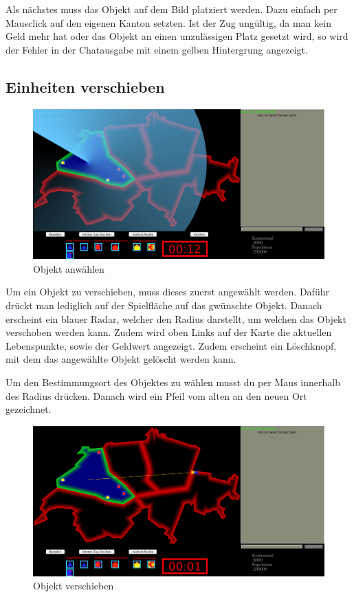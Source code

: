 \documentclass[ngerman, 12pt, pdftex]{scrartcl}[2006/07/30]
\begin{document}
Als nächstes muss das Objekt auf dem Bild platziert werden. Dazu einfach per Mausclick auf den eigenen Kanton setzten. Ist der Zug ungültig, da man kein Geld mehr hat oder das Objekt an einen unzulässigen Platz gesetzt wird, so wird der Fehler in der Chatausgabe mit einem gelben Hintergrung angezeigt.

\newpage

\subsection{Einheiten verschieben}

\begin{figure}[h]
\centering
\includegraphics[scale=0.29]{spiel/Objekt_anwaehlen.png}
\caption{Objekt anw\"{a}hlen}
\end{figure}

Um ein Objekt zu verschieben, muss dieses zuerst angew\"{a}hlt werden. Daf\"{u}hr drückt man lediglich auf der Spielfläche auf das gwünschte Objekt. Danach erscheint ein blauer Radar, welcher den Radius darstellt, um welchen das Objekt verschoben werden kann. Zudem wird oben Links auf der Karte die aktuellen Lebenspunkte, sowie der Geldwert angezeigt. Zudem erscheint ein Löschknopf, mit dem das angewählte Objekt gelöscht werden kann.

Um den Bestimmungsort des Objektes zu wählen musst du per Maus innerhalb des Radius drücken. Danach wird ein Pfeil vom alten an den neuen Ort gezeichnet.
\begin{figure}[h]
\centering
\includegraphics[scale=0.29]{spiel/Objekt_verschieben.png}
\caption{Objekt verschieben}
\end{figure}
\end{document}
